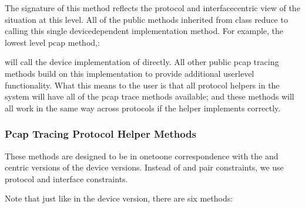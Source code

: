 \documentclass[letterpaper,10pt,english]{sphinxmanual}
\renewcommand{\sphinxcode}[1]{\texttt{\small{#1}}}
\begin{document}
The signature of this method reflects the protocol and interface\sphinxhyphen{}centric view of
the situation at this level. All of the public methods inherited from class
\sphinxcode{} reduce to calling this single device\sphinxhyphen{}dependent
implementation method.  For example, the lowest level pcap method,:

\begin{sphinxVerbatim}[commandchars=\\\{\}]
       
\end{sphinxVerbatim}

will call the device implementation of \sphinxcode{} directly.  All
other public pcap tracing methods build on this implementation to provide
additional user\sphinxhyphen{}level functionality. What this means to the user is that all
protocol helpers in the system will have all of the pcap trace methods
available; and these methods will all work in the same way across protocols if
the helper implements \sphinxcode{} correctly.


\subsubsection{Pcap Tracing Protocol Helper Methods}
\label{\detokenize{tracing:pcap-tracing-protocol-helper-methods}}
These methods are designed to be in one\sphinxhyphen{}to\sphinxhyphen{}one correspondence with the \sphinxcode{}\sphinxhyphen{}
and \sphinxcode{}\sphinxhyphen{} centric versions of the device versions. Instead of
\sphinxcode{} and \sphinxcode{} pair constraints, we use protocol and interface
constraints.

Note that just like in the device version, there are six methods:
\end{document}
